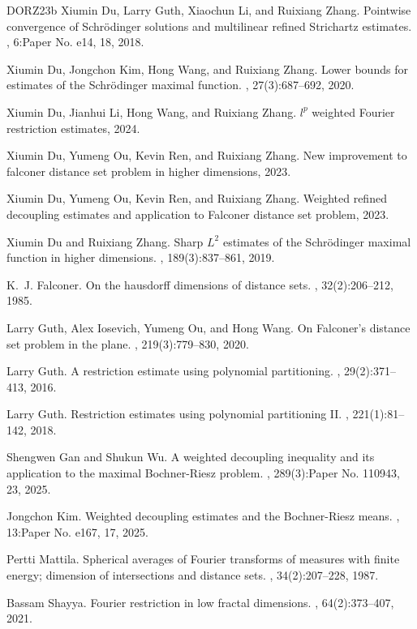 \documentclass[11pt]{amsart}
\theoremstyle{definition}
\theoremstyle{remark}
\numberwithin{equation}{section}
\begin{document}
\begin{thebibliography}{DORZ23b}
	Xiumin Du, Larry Guth, Xiaochun Li, and Ruixiang Zhang.
	\newblock Pointwise convergence of {S}chr\"odinger solutions and multilinear
	refined {S}trichartz estimates.
	, 6:Paper No. e14, 18, 2018.
	
	Xiumin Du, Jongchon Kim, Hong Wang, and Ruixiang Zhang.
	\newblock Lower bounds for estimates of the {S}chr\"{o}dinger maximal function.
	, 27(3):687--692, 2020.
	
	Xiumin Du, Jianhui Li, Hong Wang, and Ruixiang Zhang.
	\newblock $l^p$ weighted {F}ourier restriction estimates, 2024.
	
	Xiumin Du, Yumeng Ou, Kevin Ren, and Ruixiang Zhang.
	\newblock New improvement to falconer distance set problem in higher
	dimensions, 2023.
	
	Xiumin Du, Yumeng Ou, Kevin Ren, and Ruixiang Zhang.
	\newblock Weighted refined decoupling estimates and application to {F}alconer
	distance set problem, 2023.
	
	Xiumin Du and Ruixiang Zhang.
	\newblock Sharp {$L^2$} estimates of the {S}chr\"{o}dinger maximal function in
	higher dimensions.
	, 189(3):837--861, 2019.
	
	K.~J. Falconer.
	\newblock On the hausdorff dimensions of distance sets.
	, 32(2):206–212, 1985.
	
	Larry Guth, Alex Iosevich, Yumeng Ou, and Hong Wang.
	\newblock On {F}alconer's distance set problem in the plane.
	, 219(3):779--830, 2020.
	
	Larry Guth.
	\newblock A restriction estimate using polynomial partitioning.
	, 29(2):371--413, 2016.
	
	Larry Guth.
	\newblock Restriction estimates using polynomial partitioning {II}.
	, 221(1):81--142, 2018.
	
	Shengwen Gan and Shukun Wu.
	\newblock A weighted decoupling inequality and its application to the maximal
	{B}ochner-{R}iesz problem.
	, 289(3):Paper No. 110943, 23, 2025.
	
	Jongchon Kim.
	\newblock Weighted decoupling estimates and the {B}ochner-{R}iesz means.
	, 13:Paper No. e167, 17, 2025.
	
	Pertti Mattila.
	\newblock Spherical averages of {F}ourier transforms of measures with finite
	energy; dimension of intersections and distance sets.
	, 34(2):207--228, 1987.
	
	Bassam Shayya.
	\newblock Fourier restriction in low fractal dimensions.
	, 64(2):373--407, 2021.
	
\end{thebibliography}
\end{document}
